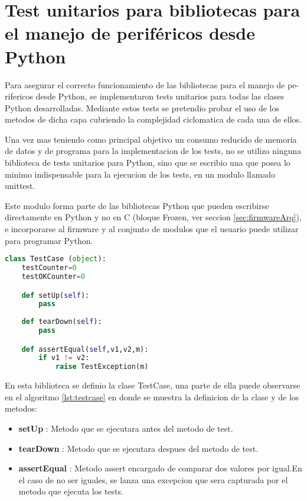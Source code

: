 \section{Test unitarios para bibliotecas para el manejo de periféricos desde Python}
\label{sec:testUnitariosPython}

Para asegurar el correcto funcionamiento de las bibliotecas para el manejo de pe-
rifericos desde Python, se implementaron tests unitarios para todas las clases Python desarrolladas. Mediante estos tests se pretendio probar el uso de los metodos de dicha capa cubriendo la
complejidad ciclomatica de cada una de ellos.

Una vez mas teniendo como principal objetivo un consumo reducido de memoria de datos y de programa para la implementacion de los tests, no se utilizo ninguna biblioteca de tests unitarios para Python, sino que se escribio una que posea lo minimo indispensable para la ejecucion de los tests, en un modulo llamado unittest. 

Este modulo forma parte de las bibliotecas Python que pueden escribirse directamente en Python y no en C (bloque Frozen, ver seccion \ref{sec:firmwareArq}), e incorporarse al firmware y al conjunto de modulos que el usuario puede utilizar para programar Python.

\begin{lstlisting}[label={lst:testcase},caption=Clase TestCase utilizada para crear tests unitarios para Python., language={python}]
class TestCase (object):
    testCounter=0
    testOKCounter=0

    def setUp(self):
        pass
    
    def tearDown(self):
        pass

    def assertEqual(self,v1,v2,m):
        if v1 != v2:
            raise TestException(m)
\end{lstlisting}

En esta biblioteca se definio la clase TestCase, una parte de ella puede observarse en el algoritmo \ref{lst:testcase} en donde se muestra la definicion de la clase y de los metodos:

\begin{itemize}
	\item \textbf{setUp} : Metodo que se ejecutara antes del metodo de test.
	\item \textbf{tearDown} : Metodo que se ejecutara despues del metodo de test.
	\item \textbf{assertEqual} : 	Metodo assert encargado de comparar dos valores por igual.En el caso de no ser iguales, se lanza una excepcion que sera capturada por el metodo que ejecuta los tests.
\end{itemize}

